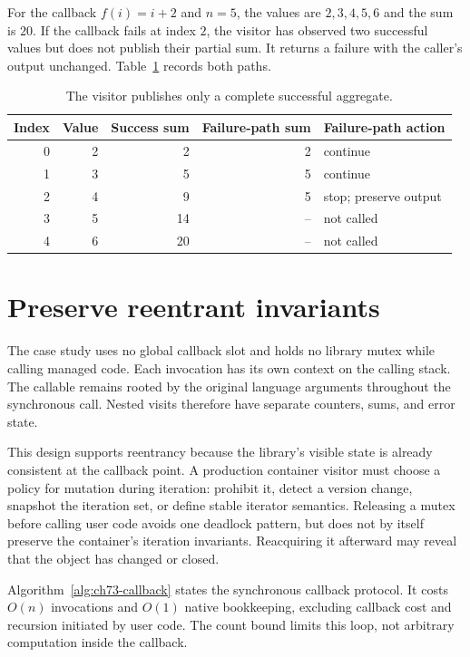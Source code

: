 For the callback $f(i)=i+2$ and $n=5$, the values are $2,3,4,5,6$ and the sum is $20$.
If the callback fails at index $2$, the visitor has observed two successful values but does not publish their partial sum.
It returns a failure with the caller's output unchanged.
Table~\ref{tab:ch73-trace} records both paths.

\begin{table}[htbp]
\caption{The visitor publishes only a complete successful aggregate.}
\label{tab:ch73-trace}
\centering
\begin{tabular}{rrrrl}
\toprule
Index & Value & Success sum & Failure-path sum & Failure-path action \\
\midrule
0 & 2 & 2 & 2 & continue \\
1 & 3 & 5 & 5 & continue \\
2 & 4 & 9 & 5 & stop; preserve output \\
3 & 5 & 14 & -- & not called \\
4 & 6 & 20 & -- & not called \\
\bottomrule
\end{tabular}
\end{table}

\section{Preserve reentrant invariants}
\label{sec:ch73-reentrant}
The case study uses no global callback slot and holds no library mutex while calling managed code.
Each invocation has its own context on the calling stack.
The callable remains rooted by the original language arguments throughout the synchronous call.
Nested visits therefore have separate counters, sums, and error state.

This design supports reentrancy because the library's visible state is already consistent at the callback point.
A production container visitor must choose a policy for mutation during iteration: prohibit it, detect a version change, snapshot the iteration set, or define stable iterator semantics.
Releasing a mutex before calling user code avoids one deadlock pattern, but does not by itself preserve the container's iteration invariants.
Reacquiring it afterward may reveal that the object has changed or closed.

Algorithm~\ref{alg:ch73-callback} states the synchronous callback protocol.
It costs $O(n)$ invocations and $O(1)$ native bookkeeping, excluding callback cost and recursion initiated by user code.
The count bound limits this loop, not arbitrary computation inside the callback.

